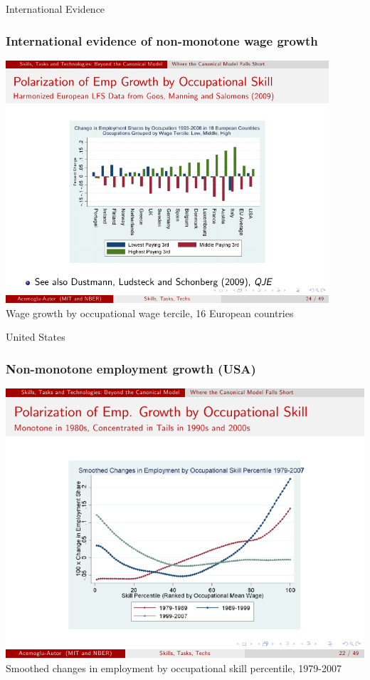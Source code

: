\documentclass[red]{beamer}
\begin{document}
\begin{frame}[t]{International Evidence}
\frametitle{International evidence of non-monotone wage growth}
\begin{center}
\includegraphics[width=0.9\textwidth]{slides/international_nonmonotone.pdf}
\\
Wage growth by occupational wage tercile, 16 European countries \citep{Acemoglu2011}
\end{center}
\end{frame}

\begin{frame}[t]{United States}
\frametitle{Non-monotone employment growth (USA)}
\begin{center}
\includegraphics[width=\textwidth]{slides/emp_occ_skill_percentile.pdf}
\\
Smoothed changes in employment by occupational skill percentile, 1979-2007
\citep{Acemoglu2011}
\end{center}
\end{frame}
\end{document}
